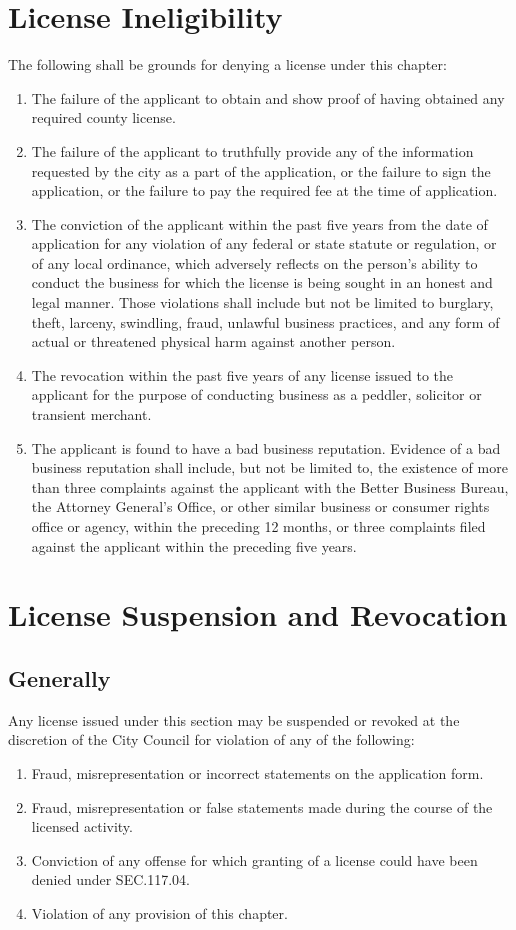 \section{License Ineligibility}
The following shall be grounds for denying a license under this chapter:
\begin{enumerate}[{\indent}A)]
    \item The failure of the applicant to obtain and show proof of having obtained any required county license.
    \item The failure of the applicant to truthfully provide any of the information requested by the city as a part of the application, or the failure to sign the application, or the failure to pay the required fee at the time of application.
    \item The conviction of the applicant within the past five years from the date of application for any violation of any federal or state statute or regulation, or of any local ordinance, which adversely reflects on the person’s ability to conduct the business for which the license is being sought in an honest and legal manner.  Those violations shall include but not be limited to burglary, theft, larceny, swindling, fraud, unlawful business practices, and any form of actual or threatened physical harm against another person.
    \item The revocation within the past five years of any license issued to the applicant for the purpose of conducting business as a peddler, solicitor or transient merchant.
    \item The applicant is found to have a bad business reputation.  Evidence of a bad business reputation shall include, but not be limited to, the existence of more than three complaints against the applicant with the Better Business Bureau, the Attorney General’s Office, or other similar business or consumer rights office or agency, within the preceding 12 months, or three complaints filed against the applicant within the preceding five years.
\end{enumerate}
\section{License Suspension and Revocation}
\subsection{Generally}
Any license issued under this section may be suspended or revoked at the discretion of the City Council for violation of any of the following:
\begin{enumerate}[{\indent}1)]
    \item Fraud, misrepresentation or incorrect statements on the application form.
    \item Fraud, misrepresentation or false statements made during the course of the licensed activity.
    \item Conviction of any offense for which granting of a license could have been denied under SEC.117.04.
    \item Violation of any provision of this chapter.
\end{enumerate}
